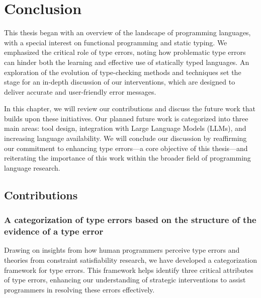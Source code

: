 

\chapter{Conclusion}

\label{chap:conclusion} 
\newcommand{\typetutor}{TypeTutor}

\graphicspath{{Figures/Conclusion}}
This thesis began with an overview of the landscape of programming languages, with a special interest on functional programming and static typing. We emphasized the critical role of type errors, noting how problematic type errors can hinder both the learning and effective use of statically typed languages. An exploration of the evolution of type-checking methods and techniques set the stage for an in-depth discussion of our interventions, which are designed to deliver accurate and user-friendly error messages.

In this chapter, we will review our contributions and discuss the future work that builds upon these initiatives. Our planned future work is categorized into three main areas: tool design, integration with Large Language Models (LLMs), and increasing language availability. We will conclude our discussion by reaffirming our commitment to enhancing type errors—a core objective of this thesis—and reiterating the importance of this work within the broader field of programming language research.


\section{Contributions}


\subsection{A categorization of type errors based on the structure of the evidence of a type error}


Drawing on insights from how human programmers perceive type errors and theories from constraint satisfiability research, we have developed a categorization framework for type errors. This framework helps identify three critical attributes of type errors, enhancing our understanding of strategic interventions to assist programmers in resolving these errors effectively.

